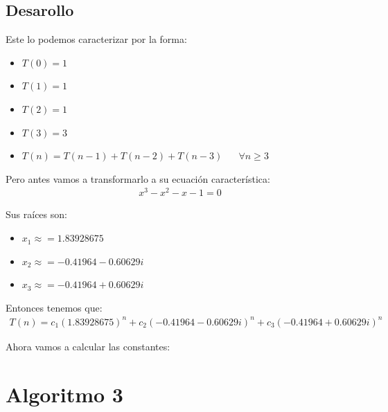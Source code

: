 \documentclass[12pt, fleqn]{article}                            %
\DeclareMathOperator \Space {\quad}                             %
\theoremstyle{break}                                            %
\begin{document}
    \subsection{Desarollo}

        Este lo podemos caracterizar por la forma:
        \begin{itemize}
            \item $T(0) = 1$
            \item $T(1) = 1$
            \item $T(2) = 1$
            \item $T(3) = 3$
            \item $T(n) = T(n - 1) + T(n - 2) + T(n -  3) \Space \forall n \geq 3$
        \end{itemize}

        Pero antes vamos a transformarlo a su ecuación característica:
        \begin{align*}
            x^3 - x^2 - x - 1 = 0 
        \end{align*}

        Sus raíces son:
        \begin{itemize}
            \item $x_1 \approx = 1.83928675$
            \item $x_2 \approx = -0.41964 - 0.60629i$
            \item $x_3 \approx = -0.41964 + 0.60629i$
        \end{itemize}

        Entonces tenemos que:
        \begin{align*}
            T(n) = c_1(1.83928675)^n + c_2(-0.41964 - 0.60629i)^n + c_3(-0.41964 + 0.60629i)^n
        \end{align*}

        Ahora vamos a calcular las constantes:




\clearpage
\section{Algoritmo 3}


\end{document}

